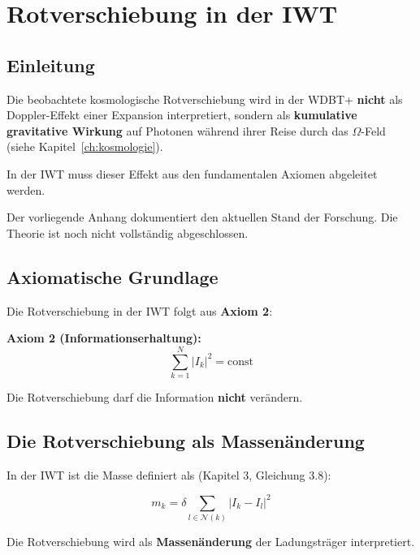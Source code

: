 
\chapter{Rotverschiebung in der IWT}
\label{app:rotverschiebung}

\section{Einleitung}
\label{app:rotverschiebung_einleitung}

Die beobachtete kosmologische Rotverschiebung wird in der WDBT+ \textbf{nicht} als Doppler-Effekt einer Expansion interpretiert, sondern als \textbf{kumulative gravitative Wirkung} auf Photonen während ihrer Reise durch das $\Omega$-Feld (siehe Kapitel~\ref{ch:kosmologie}). 

In der IWT muss dieser Effekt aus den fundamentalen Axiomen abgeleitet werden. 

Der vorliegende Anhang dokumentiert den aktuellen Stand der Forschung. Die Theorie ist noch nicht vollständig abgeschlossen.

\section{Axiomatische Grundlage}
\label{app:rotverschiebung_axiome}

Die Rotverschiebung in der IWT folgt aus \textbf{Axiom 2}:

\textbf{Axiom 2 (Informationserhaltung):}
\[
\sum_{k=1}^{N} |I_k|^2 = \text{const} \tag{Q.1}
\]

Die Rotverschiebung darf die Information \textbf{nicht} verändern.

\section{Die Rotverschiebung als Massenänderung}
\label{app:rotverschiebung_masse}

In der IWT ist die Masse definiert als (Kapitel 3, Gleichung 3.8):

\[
m_k = \delta \sum_{l \in \mathcal{N}(k)} |I_k - I_l|^2 \tag{Q.2}
\]

Die Rotverschiebung wird als \textbf{Massenänderung} der Ladungsträger interpretiert.

